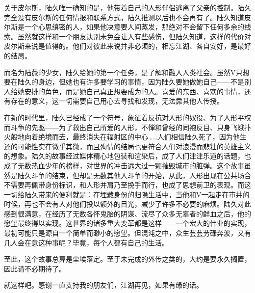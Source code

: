 关于皮尔斯，陆久唯一确知的是，他带着自己的人形伴侣逃离了父亲的控制。陆久完全没有皮尔斯的任何情报和联系方式，陆久推测以后也不会再有了。陆久知道皮尔斯是一个心思缜密的人，如果他决意要人间蒸发，那绝对不会留下任何多余的线索。虽然就这样和一个朋友诀别未免会让人有些感伤，但陆久知道，这样的代价对皮尔斯来说是值得的。他们对彼此来说并非必须的，相忘江湖、各自安好，是最好的结局。

而名为陆薇的少女，陆久给她的第一个任务，是了解和融入人类社会。虽然V只想要在陆久的身边，但她也有许多要学习的事情，因为陆久要她做她自己——不是别人给她安排的角色，而是她自己真正想要成为的人。喜爱的东西、喜欢的事情，还有存在的意义，这一切需要自己用心去寻找和发现，无法靠其他人传授。

在新的时代里，陆久已经成了一个符号，象征着反抗对人形的奴役、为了人形平权而斗争的先驱——为了救出自己所爱的人形，不惮和曾经的同袍反目、只身飞蛾扑火般地向着绝境而去，最终消失在辐射区的中心……人们相信陆久死了，因为他生还的可能性实在微乎其微，而且殉情的结局也更符合人们对浪漫而悲壮的英雄主义的想象。陆久的故事经过媒体精心地包装和渲染后，成了人们津津乐道的话题，也成了无数热血少年的榜样，对世界的冲击远大过一颗摧毁城市的脏弹。这个故事虽然是陆久斗争的结束，但却是无数其他人斗争的开始，从此，人形出现在公共场合不需要再佩带身份标识，和人形并肩乃至挽手而行，也成了思想前卫的表现。而这一切给陆久带来的便利就是：在埋藏身份的归隐生活中，当他和V一起走在市井的时候，再也不会有人对他们投以额外的目光，减少了许多不必要的麻烦。陆久对此感到很满意，在经历了无数各怀鬼胎的阴谋、流尽了众多无辜者的鲜血之后，他的愿望最终得以实现。这世界的诸多重大变革都是这样——一个宏大的伟业的实现，最初可能只是源自一个简单而渺小的愿望。但混沌之中，众生芸芸劳碌奔波，又有几人会在意这种事呢？毕竟，每个人都有自己的生活。

至此，这个故事总算是尘埃落定。至于未完成的外传之类的，大约是要永久搁置，因此请不必期待了。

就这样吧。感谢一直支持我的朋友们，江湖再见，如果有缘的话。

